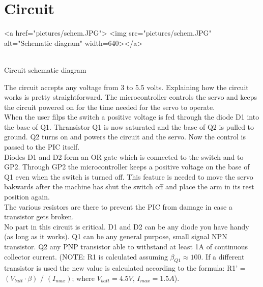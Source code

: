 \documentclass{article}
\begin{document}
\section{Circuit}
\begin{center}
\begin{html}
<a href="pictures/schem.JPG">
<img src="pictures/schem.JPG" alt="Schematic diagram" width=640></a>
\end{html}
\\Circuit schematic diagram
\end{center}
The circuit accepts any voltage from 3 to 5.5 volts.
Explaining how the circuit works is pretty straightforward.
The microcontroller controls the servo and keeps the circuit powered on for the time needed for the servo to operate.
\\When the user filps the switch a positive voltage is fed through the diode D1 into the base of Q1. Thransistor Q1 is now saturated and the base of Q2 is pulled to ground. Q2 turns on and powers the circuit and the servo. Now the control is passed to the PIC itself.
\\Diodes D1 and D2 form an OR gate which is connected to the switch and to GP2. Through GP2 the microcontroller keeps a positive voltage on the base of Q1 even when the switch is turned off. This feature is needed to move the servo bakwards after the machine has shut the switch off and place the arm in its rest position again.
\\The various resistors are there to prevent the PIC from damage in case a transistor gets broken.
\\No part in this circuit is critical. D1 and D2 can be any diode you have handy (as long as it works). Q1 can be any general purpose, small signal NPN transistor. Q2 any PNP transistor able to withstand at least 1A of continuous collector current.
(NOTE: R1 is calculated assuming $\beta_{Q1} \approx 100$. If a different transistor is used the new value is calculated according to the formula:
R1' = $(V_{batt} \cdot \beta)$ / $(I_{max})$; where $V_{batt}=4.5V$, $I_{max}=1.5A$).
%
%
\end{document}
